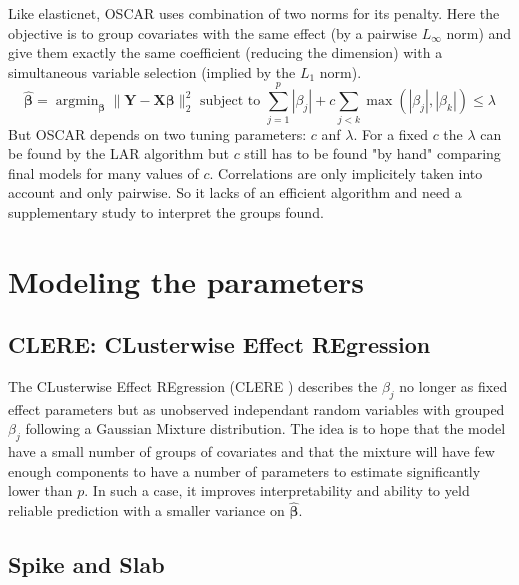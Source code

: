 \documentclass[12pt,a4paper]{report}
\begin{document}
			Like elasticnet, \textsc{OSCAR} \cite{bondell2008simultaneous} uses combination of two norms for its penalty. Here the objective is to group covariates with the same effect (by a pairwise $L_\infty$ norm) and give them exactly the same coefficient (reducing the dimension) with a simultaneous variable selection (implied by the $L_1$ norm).
			\begin{equation}
				\hat{\boldsymbol{\beta}}=\operatorname{argmin}_{\boldsymbol{\beta}} \parallel\boldsymbol{Y}-\boldsymbol{X}\boldsymbol{\beta} \parallel^2_2 \textrm{ subject to } \sum_{j=1}^p|\beta_j|+c\sum_{j<k}\operatorname{max}(|\beta_j|,|\beta_k|) \leq \lambda		
			\end{equation}						
			But \textsc{OSCAR} depends on two tuning parameters: $c$ anf $\lambda$. For a fixed $c$ the $\lambda$ can be found by the \textsc{LAR} algorithm but $c$ still has to be found "by hand" comparing final models for many values of $c$.
			Correlations are only implicitely taken into account and only pairwise. So it lacks of an efficient algorithm and need a supplementary study to interpret the groups found.
	\section{Modeling the parameters}			%

		\subsection{CLERE: CLusterwise Effect REgression}		%

			\cite{yengo2012variable}%
			The CLusterwise Effect REgression (\textsc{CLERE} \cite{yengo2012variable}) describes the $\beta_j$ no longer as fixed effect parameters but as unobserved independant random variables with grouped $\beta_j$ following a Gaussian Mixture distribution. The idea is to hope that the model have a small number of groups of covariates and that the mixture will have few enough components to have a number of parameters to estimate significantly lower than $p$. In such a case, it improves interpretability and ability to yeld reliable prediction with a smaller variance on $\boldsymbol{\hat{\beta}}$. 
	
		\subsection{Spike and Slab}			%
\end{document}

